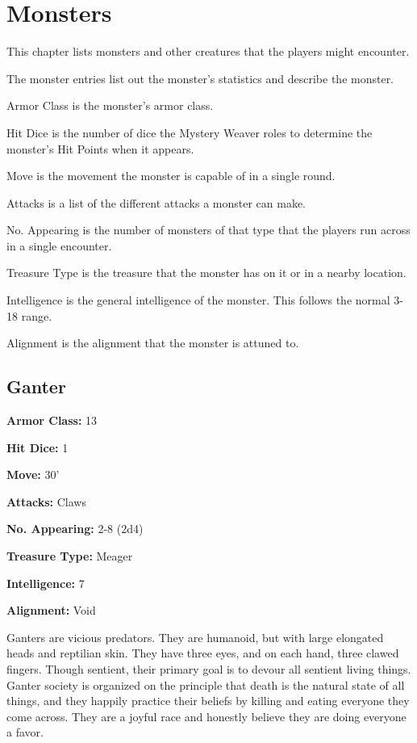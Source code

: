 \chapter{Monsters}

\begin{multicols}{2}

This chapter lists monsters and other creatures that the
players might encounter.

The monster entries list out the monster's statistics and
describe the monster.

Armor Class is the monster's armor class.

Hit Dice is the number of dice the Mystery Weaver roles to
determine the monster's Hit Points when it appears.

Move is the movement the monster is capable of in a single
round.

Attacks is a list of the different attacks a monster can
make.

No. Appearing is the number of monsters of that type that
the players run across in a single encounter.

Treasure Type is the treasure that the monster has on it or
in a nearby location.

Intelligence is the general intelligence of the monster. This
follows the normal 3-18 range.

Alignment is the alignment that the monster is attuned to.

\section{Ganter}

\textbf{Armor Class:} 13

\textbf{Hit Dice:} 1

\textbf{Move:} 30'

\textbf{Attacks:} Claws

\textbf{No. Appearing:} 2-8 (2d4)

\textbf{Treasure Type:} Meager

\textbf{Intelligence:} 7

\textbf{Alignment:} Void

Ganters are vicious predators. They are humanoid, but with large
elongated heads and reptilian skin. They have three eyes, and on
each hand, three clawed fingers. Though sentient, their primary
goal is to devour all sentient living things. Ganter society is
organized on the principle that death is the natural state of
all things, and they happily practice their beliefs by killing
and eating everyone they come across. They are a joyful race and
honestly believe they are doing everyone a favor.


\end{multicols}
